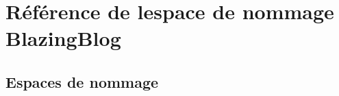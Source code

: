 \hypertarget{namespace_blazing_blog}{}\section{Référence de l\textquotesingle{}espace de nommage Blazing\+Blog}
\label{namespace_blazing_blog}
\subsection*{Espaces de nommage}
\begin{DoxyCompactItemize}
\end{DoxyCompactItemize}
